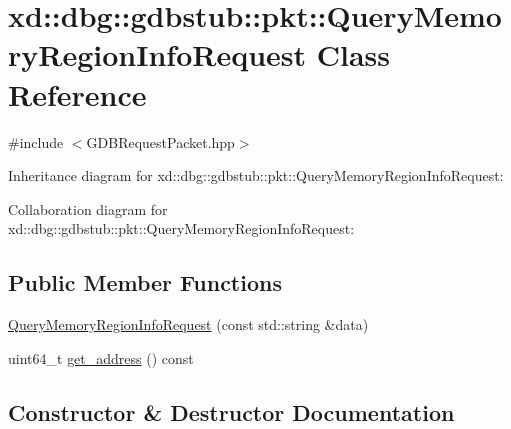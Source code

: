 \hypertarget{classxd_1_1dbg_1_1gdbstub_1_1pkt_1_1_query_memory_region_info_request}{}\section{xd\+:\+:dbg\+:\+:gdbstub\+:\+:pkt\+:\+:Query\+Memory\+Region\+Info\+Request Class Reference}
\label{classxd_1_1dbg_1_1gdbstub_1_1pkt_1_1_query_memory_region_info_request}


{\ttfamily \#include $<$G\+D\+B\+Request\+Packet.\+hpp$>$}



Inheritance diagram for xd\+:\+:dbg\+:\+:gdbstub\+:\+:pkt\+:\+:Query\+Memory\+Region\+Info\+Request\+:


Collaboration diagram for xd\+:\+:dbg\+:\+:gdbstub\+:\+:pkt\+:\+:Query\+Memory\+Region\+Info\+Request\+:
\subsection*{Public Member Functions}
\begin{DoxyCompactItemize}
\item 
\mbox{\hyperlink{classxd_1_1dbg_1_1gdbstub_1_1pkt_1_1_query_memory_region_info_request_a7b167583ebc3bdafbec7c63f0525d823}{Query\+Memory\+Region\+Info\+Request}} (const std\+::string \&data)
\item 
uint64\+\_\+t \mbox{\hyperlink{classxd_1_1dbg_1_1gdbstub_1_1pkt_1_1_query_memory_region_info_request_a5ff1904c6492c0b8dea3fdb7faa1a4ed}{get\+\_\+address}} () const
\end{DoxyCompactItemize}


\subsection{Constructor \& Destructor Documentation}
\mbox{\label{classxd_1_1dbg_1_1gdbstub_1_1pkt_1_1_query_memory_region_info_request_a7b167583ebc3bdafbec7c63f0525d823}} 
